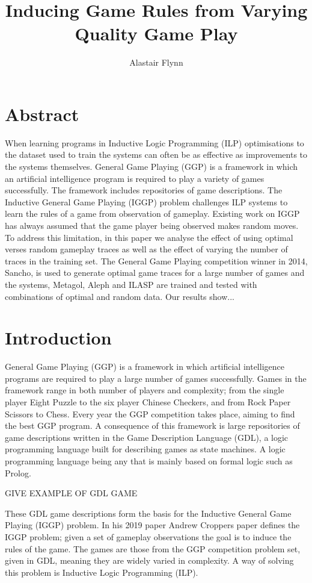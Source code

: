 \documentclass[a4paper,12pt]{report}
\begin{document}
\title{\Large{\textbf{Inducing Game Rules from Varying Quality Game Play}}}
\author{Alastair Flynn}
\maketitle
\chapter{Abstract}
When learning programs in Inductive Logic Programming (ILP) optimisations to the dataset used to train the systems can often be as effective as improvements to the systems themselves. General Game Playing (GGP) is a framework in which an artificial intelligence program is required to play a variety of games successfully. The framework includes repositories of game descriptions. The Inductive General Game Playing (IGGP) problem challenges ILP systems to learn the rules of a game from observation of gameplay. Existing work on IGGP has always assumed that the game player being observed makes random moves. To address this limitation, in this paper we analyse the effect of using optimal verses random gameplay traces as well as the effect of varying the number of traces in the training set. The General Game Playing competition winner in 2014, Sancho, is used to generate optimal game traces for a large number of games and the systems, Metagol, Aleph and ILASP are trained and tested with combinations of optimal and random data. Our results show...
\chapter{Introduction}
General Game Playing (GGP) is a framework in which artificial intelligence programs are required to play a large number of games successfully.\cite{Genesereth/GGPOverview} Games in the framework range in both number of players and complexity; from the single player Eight Puzzle to the six player Chinese Checkers, and from Rock Paper Scissors to Chess\cite{GGP-Website}. Every year the GGP competition takes place, aiming to find the best GGP program. A consequence of this framework is large repositories of game descriptions written in the Game Description Language (GDL), a logic programming language built for describing games as state machines\cite{GDL_Spec}. A logic programming language being any that is mainly based on formal logic such as Prolog. 

GIVE EXAMPLE OF GDL GAME

These GDL game descriptions form the basis for the Inductive General Game Playing (IGGP) problem. In his 2019 paper Andrew Croppers paper \cite{Cropper/IGGP} defines the IGGP problem; given a set of gameplay observations the goal is to induce the rules of the game. The games are those from the GGP competition problem set, given in GDL, meaning they are widely varied in complexity. A way of solving this problem is Inductive Logic Programming (ILP).
\end{document}
